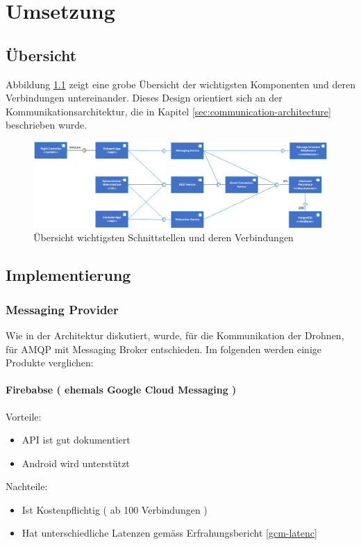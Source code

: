 \newpage
\chapter{Umsetzung}

\section{Übersicht}

Abbildung \ref{fig:component-overview} zeigt eine grobe Übersicht der wichtigsten Komponenten und deren Verbindungen untereinander. Dieses Design orientiert sich an der Kommunikationsarchitektur, die in Kapitel \ref{sec:communication-architecture} beschrieben wurde.

\begin{figure}[H]
	\includegraphics[width=1.0\textwidth]{images/component-overview.png}
	\caption{Übersicht wichtigsten Schnittstellen und deren Verbindungen }
	\label{fig:component-overview}
\end{figure}

\section{Implementierung}

\subsection{Messaging Provider}

Wie in der Architektur diskutiert, wurde, für die Kommunikation der Drohnen, für AMQP mit Messaging Broker entschieden.
Im folgenden werden einige Produkte verglichen: 
\subsubsection{Firebabse ( ehemals Google Cloud Messaging )}
Vorteile:
\begin{itemize}
	\item API ist gut dokumentiert
	\item Android wird unterstützt
\end{itemize} 
Nachteile:
\begin{itemize}
	\item Ist Kostenpflichtig ( ab 100 Verbindungen )
	\item Hat unterschiedliche Latenzen gemäss Erfrahungsbericht \ref{gcm-latenc}
\end{itemize}

